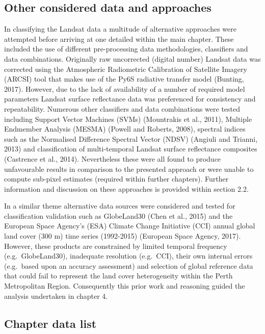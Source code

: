 \documentclass[]{book}
\begin{document}
\subsection{Other considered data and
approaches}\label{other-considered-data-and-approaches}

In classifying the Landsat data a multitude of alternative approaches
were attempted before arriving at one detailed within the main chapter.
These included the use of different pre-processing data methodologies,
classifiers and data combinations. Originally raw uncorrected (digital
number) Landsat data was corrected using the Atmospheric Radiometric
Calibration of Satellite Imagery (ARCSI) tool that makes use of the Py6S
radiative transfer model (Bunting, 2017). However, due to the lack of
availability of a number of required model parameters Landsat surface
reflectance data was preferenced for consistency and repeatability.
Numerous other classifiers and data combinations were tested including
Support Vector Machines (SVMs) (Mountrakis et al., 2011), Multiple
Endmember Analysis (MESMA) (Powell and Roberts, 2008), spectral indices
such as the Normalised Difference Spectral Vector (NDSV) (Angiuli and
Trianni, 2013) and classification of multi-temporal Landsat surface
reflectance composites (Castrence et al., 2014). Nevertheless these were
all found to produce unfavourable results in comparison to the presented
approach or were unable to compute sub-pixel estimates (required within
further chapters). Further information and discussion on these
approaches is provided within section 2.2.

In a similar theme alternative data sources were considered and tested
for classification validation such as GlobeLand30 (Chen et al., 2015)
and the European Space Agency's (ESA) Climate Change Initiative (CCI)
annual global land cover (300 m) time series (1992-2015) (European Space
Agency, 2017). However, these products are constrained by limited
temporal frequency (e.g.~GlobeLand30), inadequate resolution (e.g.~CCI),
their own internal errors (e.g.~based upon an accuracy assessment) and
selection of global reference data that could fail to represent the land
cover heterogeneity within the Perth Metropolitan Region. Consequently
this prior work and reasoning guided the analysis undertaken in chapter
4.

\subsection{Chapter data list}\label{chapter-data-list}
\end{document}
